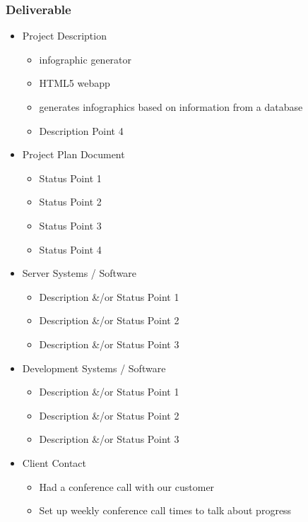 \documentclass[11pt,a4paper,oneside]{article}
\begin{document}
\subsubsection{Deliverable}
\begin{itemize}
\item Project Description
  \begin{itemize}
  \item infographic generator
  \item HTML5 webapp
  \item generates infographics based on information from a database
  \item Description Point 4
  \end{itemize}

\item Project Plan Document
  \begin{itemize}
  \item Status Point 1
  \item Status Point 2
  \item Status Point 3
  \item Status Point 4
  \end{itemize}

\item Server Systems / Software
  \begin{itemize}
  \item Description \&/or Status Point 1
  \item Description \&/or Status Point 2
  \item Description \&/or Status Point 3
  \end{itemize}

\item Development Systems / Software
  \begin{itemize}
  \item Description \&/or Status Point 1
  \item Description \&/or Status Point 2
  \item Description \&/or Status Point 3
  \end{itemize}

\item Client Contact
  \begin {itemize}
  \item Had a conference call with our customer
  \item Set up weekly conference call times to talk about progress
  \end{itemize}


\end{itemize}
\end{document}
